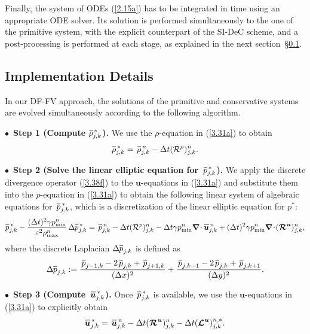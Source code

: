 \documentclass[A4paper,12pt,twoside]{article}
\numberwithin{equation}{section}
\numberwithin{figure}{section}
\numberwithin{table}{section}
\def\bnabla{\bm{\nabla}}
\newcommand{\dt}{\Delta t}
\newcommand{\dx}{\Delta x}
\newcommand{\dy}{\Delta y}
\newcommand{\ve}{\varepsilon}
\newcommand\eref[1]{(\ref{#1})}
\newcommand*\xbar[1]{%
  \hbox{%
    \vbox{%
      \hrule height 0.5pt %
      \kern0.4ex%
      \hbox{%
        \kern-0.05em%
        \ensuremath{#1}%
        \kern-0.00em%
      }%
    }%
  }%
}
\newcommand{\lore}[1]{{\leavevmode\color{red} #1}}
\begin{document}
Finally, the system of ODEs \eref{2.15a} has to be integrated in time using an appropriate ODE solver. 
\lore{Its solution is performed simultaneously to the one of the primitive system, with the explicit counterpart of the SI-DeC scheme, and a post-processing is performed at each stage, as explained in the next section~\S\ref{sec422}.}

\subsection{Implementation Details}\label{sec422}
In \lore{our} DF-FV approach, the solutions of the primitive and conservative systems are evolved simultaneously according to the following
algorithm.


\smallskip
\noindent
$\bullet\,$ \textbf{Step 1 (Compute $\xbar\rho^{\,*}_{j,k}$).} We use the $\rho$-equation in \eref{3.31a} to obtain
\begin{equation*}
\xbar\rho^{\,*}_{j,k}=\,\xbar\rho^{\,n}_{j,k}-\dt({\cal R}^\rho)^n_{j,k}.
\end{equation*}

\smallskip
\noindent
$\bullet\,$ \textbf{Step 2 (Solve the linear elliptic equation for $\,\xbar p^{\,*}_{j,k}$).} We apply the discrete divergence operator
\eref{3.38f} to the $\bm u$-equations 
in \eref{3.31a} and substitute them into the $p$-equation in \eref{3.31a} to obtain the following
linear system of algebraic equations for $\,\xbar p^{\,*}_{j,k}$, which is a discretization of the linear elliptic equation for $p^*$:
\begin{equation*}
\xbar p^{\,*}_{j,k}-\frac{(\dt)^2\gamma p_{\min}^n}{\ve^2\rho_{\max}^n}\,\Delta\xbar p_{j,k}^{\,*}=\,\xbar p^{\,n}_{j,k}-
\dt({\cal R}^p)^n_{j,k}-\dt\gamma p_{\min}^n\bnabla\!\cdot\xbar{\bm u}_{j,k}^{\,n}
+(\dt)^2\gamma p_{\min}^n\bnabla\!\cdot\!(\bm{{\cal R}}^{\bm u})^n_{j,k},
\label{3.39f}
\end{equation*}
where the discrete Laplacian $\Delta\xbar p_{j,k}$ is defined as
$$
\Delta\xbar p_{j,k}:=\frac{\,\xbar p_{j-1,k}-2\,\xbar p_{j,k}+\,\xbar p_{j+1,k}}{(\dx)^2}+
\frac{\,\xbar p_{j,k-1}-2\,\xbar p_{j,k}+\,\xbar p_{j,k+1}}{(\dy)^2}.
$$

\smallskip
\noindent
$\bullet\,$ \textbf{Step 3 (Compute $\,\xbar{\bm u}^{\,*}_{j,k}$).} Once $\,\xbar p^{\,*}_{j,k}$ is available, we use the $\bm u$-equations
in \eref{3.31a} to \lore{explicitly} obtain
\begin{equation*}
\xbar{\bm u}^{\,*}_{j,k}=\,\xbar{\bm u}^{\,n}_{j,k}-\dt(\bm{{\cal R}}^{\bm u})^n_{j,k}-\dt(\bm{{\cal L}}^{\bm u})^{n,*}_{j,k}.
\end{equation*}
\end{document}
